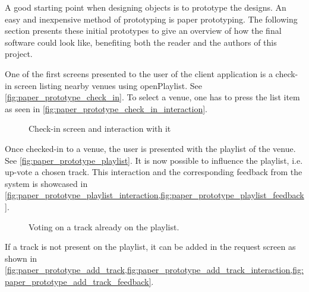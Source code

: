 \label{paper_prototype}
A good starting point when designing objects is to prototype the
designs. An easy and inexpensive method of prototyping is paper
prototyping. The following section presents these initial prototypes
to give an overview of how the final software could look like,
benefiting both the reader and the authors of this project.

One of the first screens presented to the user of the client
application is a check-in screen listing nearby venues using
openPlaylist. See \cref{fig:paper_prototype_check_in}. To select a
venue, one has to press the list item as seen in \cref{fig:paper_prototype_check_in_interaction}.

\begin{figure}[h!]
  \centering
  \caption{Check-in screen and interaction with it}
\end{figure}


Once checked-in to a venue, the user is presented with the playlist of
the venue. See \cref{fig:paper_prototype_playlist}. It is now possible
to influence the playlist, i.e. up-vote a chosen track. This
interaction and the corresponding feedback from the system is showcased in
\cref{fig:paper_prototype_playlist_interaction,fig:paper_prototype_playlist_feedback}.

\begin{figure}[h!]
  \centering
  \caption{Voting on a track already on the playlist.}
\end{figure}

If a track is not present on the playlist, it can be added in the
request screen as shown in
\cref{fig:paper_prototype_add_track,fig:paper_prototype_add_track_interaction,fig:paper_prototype_add_track_feedback}.


